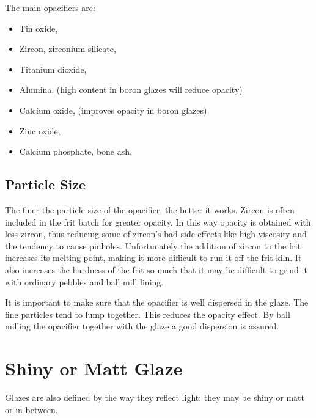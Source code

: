 The main opacifiers are:
\begin{itemize}
\item Tin oxide, 
\item Zircon, zirconium silicate, 
\item Titanium dioxide, 
\item Alumina,  (high content in boron glazes will reduce opacity)
\item Calcium oxide,  (improves opacity in boron glazes)
\item Zinc oxide, 
\item Calcium phosphate, bone ash, 
\end{itemize}
\subsection{Particle Size}
The finer the particle size of the opacifier, the better it works. Zircon is 
often included in the frit batch for greater opacity. In this way opacity is 
obtained with less zircon, thus reducing some of zircon's bad side effects like 
high viscosity and the tendency to cause pinholes. Unfortunately the addition 
of zircon to the frit increases its melting point, making it more difficult to 
run it off the frit kiln. It also increases the hardness of the frit so much 
that it may be difficult to grind it with ordinary pebbles and ball mill lining.

It is important to make sure that the opacifier is well dispersed in the glaze. 
The fine particles tend to lump together. This reduces the opacity effect. By 
ball milling the opacifier together with the glaze a good dispersion is assured.
\section{Shiny or Matt Glaze}
Glazes are also defined by the way they reflect light: they may be shiny or 
matt or in between.
